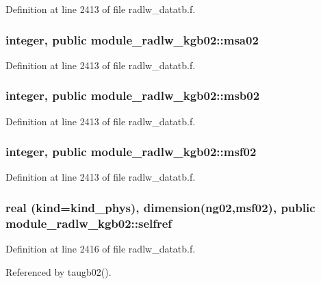 Definition at line 2413 of file radlw\+\_\+datatb.\+f.

\subsubsection[{\texorpdfstring{msa02}{msa02}}]{\setlength{\rightskip}{0pt plus 5cm}integer, public module\+\_\+radlw\+\_\+kgb02\+::msa02}\hypertarget{namespacemodule__radlw__kgb02_a370b514d7834ac2a22d245f118882bf4}{}\label{namespacemodule__radlw__kgb02_a370b514d7834ac2a22d245f118882bf4}


Definition at line 2413 of file radlw\+\_\+datatb.\+f.

\subsubsection[{\texorpdfstring{msb02}{msb02}}]{\setlength{\rightskip}{0pt plus 5cm}integer, public module\+\_\+radlw\+\_\+kgb02\+::msb02}\hypertarget{namespacemodule__radlw__kgb02_a03e70b84fd16795104a3fb7b425af70c}{}\label{namespacemodule__radlw__kgb02_a03e70b84fd16795104a3fb7b425af70c}


Definition at line 2413 of file radlw\+\_\+datatb.\+f.

\subsubsection[{\texorpdfstring{msf02}{msf02}}]{\setlength{\rightskip}{0pt plus 5cm}integer, public module\+\_\+radlw\+\_\+kgb02\+::msf02}\hypertarget{namespacemodule__radlw__kgb02_a99b728d38d664afc203303563541ab5c}{}\label{namespacemodule__radlw__kgb02_a99b728d38d664afc203303563541ab5c}


Definition at line 2413 of file radlw\+\_\+datatb.\+f.

\subsubsection[{\texorpdfstring{selfref}{selfref}}]{\setlength{\rightskip}{0pt plus 5cm}real (kind=kind\+\_\+phys), dimension(ng02,{\bf msf02}), public module\+\_\+radlw\+\_\+kgb02\+::selfref}\hypertarget{namespacemodule__radlw__kgb02_addb071e93b4ff49ba1f1c4d102e275f1}{}\label{namespacemodule__radlw__kgb02_addb071e93b4ff49ba1f1c4d102e275f1}


Definition at line 2416 of file radlw\+\_\+datatb.\+f.



Referenced by taugb02().

